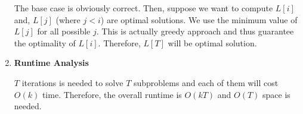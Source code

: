 \documentclass[11pt]{article}
\newenvironment{qparts}{\begin{enumerate}[{(}a{)}]}{\end{enumerate}}
\begin{document}
\begin{qparts}
\begin{enumerate}
		The base case is obviously correct. Then, suppose we want to compute $L[i]$ and, $L[j]$ (where $j<i$) are optimal solutions. We use the minimum value of $L[j]$ for all possible $j$. This is actually greedy approach and thus guarantee the  optimality of $L[i]$. Therefore, $L[T]$ will be optimal solution.
		
		\item \textbf{Runtime Analysis}
		
		$T$ iterations is needed to solve $T$ subproblems and each of them will cost $O(k)$ time. Therefore, the overall runtime is $O(kT)$ and $O(T)$ space is needed.
	
	\end{enumerate}
		
\end{qparts}


\newpage
\end{document}
